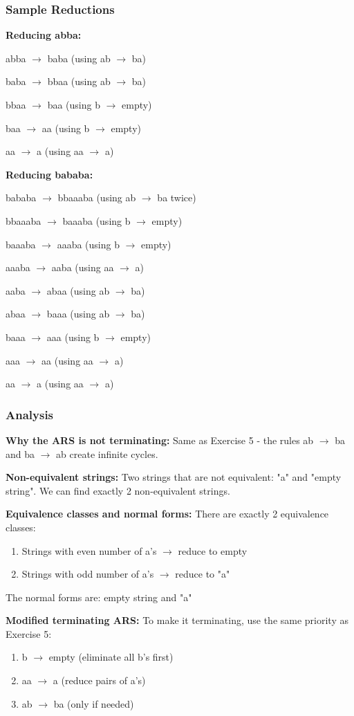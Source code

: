 \documentclass{article}
\theoremstyle{theorem}
\theoremstyle{definition}
\theoremstyle{remark}
\begin{document}
\subsubsection{Sample Reductions}
\textbf{Reducing abba:}

abba $\to$ baba (using ab $\to$ ba)

baba $\to$ bbaa (using ab $\to$ ba)

bbaa $\to$ baa (using b $\to$ empty)

baa $\to$ aa (using b $\to$ empty)

aa $\to$ a (using aa $\to$ a)

\textbf{Reducing bababa:}

bababa $\to$ bbaaaba (using ab $\to$ ba twice)

bbaaaba $\to$ baaaba (using b $\to$ empty)

baaaba $\to$ aaaba (using b $\to$ empty)

aaaba $\to$ aaba (using aa $\to$ a)

aaba $\to$ abaa (using ab $\to$ ba)

abaa $\to$ baaa (using ab $\to$ ba)

baaa $\to$ aaa (using b $\to$ empty)

aaa $\to$ aa (using aa $\to$ a)

aa $\to$ a (using aa $\to$ a)

\subsubsection{Analysis}
\textbf{Why the ARS is not terminating:}
Same as Exercise 5 - the rules ab $\to$ ba and ba $\to$ ab create infinite cycles.

\textbf{Non-equivalent strings:}
Two strings that are not equivalent: "a" and "empty string". We can find exactly 2 non-equivalent strings.

\textbf{Equivalence classes and normal forms:}
There are exactly 2 equivalence classes:
\begin{enumerate}
\item Strings with even number of a's $\to$ reduce to empty
\item Strings with odd number of a's $\to$ reduce to "a"
\end{enumerate}

The normal forms are: empty string and "a"

\textbf{Modified terminating ARS:}
To make it terminating, use the same priority as Exercise 5:
\begin{enumerate}
\item b $\to$ empty (eliminate all b's first)
\item aa $\to$ a (reduce pairs of a's)
\item ab $\to$ ba (only if needed)
\end{enumerate}
\end{document}
